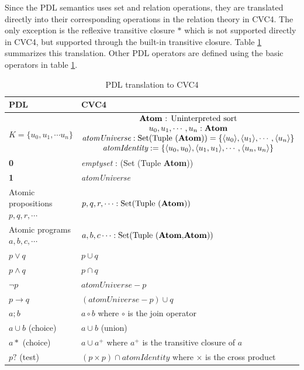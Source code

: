 \documentclass[12pt,a4paper]{article}
\begin{document}
Since the PDL semantics uses set and relation operations, they are translated directly into their corresponding operations in the relation theory in CVC4. The only exception is the reflexive transitive closure $*$ which is not supported directly in CVC4, but supported through the built-in transitive closure. Table \ref{tab:translation} summarizes this translation. Other PDL operators are defined using the basic operators in table \ref{tab:translation}. 

\begin{table}
\begin{center}
\begin{tabular}{ll} 
\toprule
PDL & CVC4 \\    
\midrule    
$K=\lbrace u_0, u_1, \cdots u_n \rbrace$ &  
$\begin{matrix}
\text{\textbf{Atom} : \text{Uninterpreted sort}} \\
u_0, u_1, \cdots, u_n: \textbf{Atom} \\
\textit{atomUniverse}: \text{Set(Tuple (\textbf{Atom}))} = \lbrace \langle u_0 \rangle, \langle u_1 \rangle, \cdots , \langle u_n \rangle \rbrace \\
\textit{atomIdentity}:  = \lbrace \langle u_0, u_0 \rangle, \langle u_1, u_1 \rangle, \cdots , \langle u_n, u_n \rangle \rbrace \\
\end{matrix}$ \\ \midrule   
\textbf{0} & \textit{emptyset} : (Set (Tuple \textbf{Atom})) \\
\textbf{1} & \textit{atomUniverse} \\
Atomic propositions $p, q, r, \cdots$ & $p, q, r, \cdots : \text{Set(Tuple (\textbf{Atom}))}$ \\
Atomic programs $a, b, c, \cdots$ & $a, b, c \cdots : \text{Set(Tuple (\textbf{Atom}$,$\textbf{Atom}))}$ \\
$p \vee q$ & $p \cup q$ \\
$p \wedge q$ & $p \cap q$ \\
$\neg p$ & $\textit{atomUniverse} - p$ \\
$p \rightarrow q$ & $(\textit{atomUniverse}- p)\cup q$ \\
$a;b$ & $a \circ b$ where $\circ$ is the join operator\\
$a \cup b$ (choice) & $a \cup b$ (union)\\
$a*$ (choice) & $a \cup a^+$  where $a^+$ is the transitive closure of $a$\\
$p?$ (test) & $(p \times p) \cap \textit{atomIdentity}$ where $\times$ is the cross product\\
\bottomrule
\end{tabular}
\end{center}
\caption{PDL translation to CVC4} \label{tab:translation}
\end{table}
\end{document}
